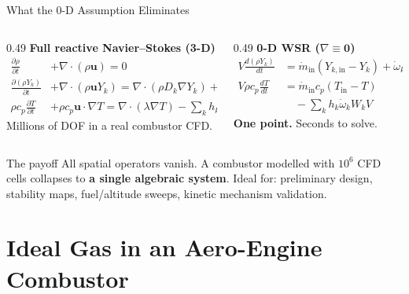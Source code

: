 \documentclass[12pt,aspectratio=169]{beamer}
\newcommand{\ddt}[1]{\frac{d#1}{dt}}
\newcommand{\Vr}{V}
\newcommand{\Tin}{T_{\text{in}}}
\newcommand{\mdot}{\dot{m}}
\newcommand{\pd}[2]{\frac{\partial #1}{\partial #2}}
\begin{document}
\begin{frame}{What the 0-D Assumption Eliminates}

  \begin{columns}[t]
    \begin{column}{0.49\textwidth}
      \textbf{Full reactive Navier--Stokes (3-D)}
      \begin{align*}
        \pd{\rho}{t} &+ \nabla\cdot(\rho\mathbf{u}) = 0\\[2pt]
        \pd{(\rho Y_k)}{t} &+ \nabla\cdot(\rho\mathbf{u}Y_k)
          = \nabla\cdot(\rho D_k \nabla Y_k) + \dot{\omega}_k W_k\\[2pt]
        \rho c_p\pd{T}{t} &+ \rho c_p\mathbf{u}\cdot\nabla T
          = \nabla\cdot(\lambda\nabla T) - \textstyle\sum_k h_k \dot{\omega}_k W_k
      \end{align*}
      \vspace{0.5em}
      \small Millions of DOF in a real combustor CFD.
    \end{column}
    \begin{column}{0.49\textwidth}
      \textbf{0-D WSR \quad($\nabla \equiv \mathbf{0}$)}
      \begin{align*}
        \Vr\ddt{(\rho Y_k)}
          &= \mdot_{\text{in}}(Y_{k,\text{in}}-Y_k)
            + \dot{\omega}_k W_k \Vr \\[8pt]
        \Vr \rho c_p \ddt{T}
          &= \mdot_{\text{in}} c_p(\Tin-T)\\
          &\quad - \textstyle\sum_k h_k \dot{\omega}_k W_k \Vr
      \end{align*}
      \vspace{0.5em}
      \small \textbf{One point.} Seconds to solve.
    \end{column}
  \end{columns}

  \medskip
  \begin{block}{The payoff}
    All spatial operators vanish.  A combustor modelled with $10^6$ CFD cells
    collapses to \textbf{a single algebraic system}.
    Ideal for: preliminary design, stability maps, fuel/altitude sweeps,
    kinetic mechanism validation.
  \end{block}
\end{frame}

\section{Ideal Gas in an Aero-Engine Combustor}
\end{document}

